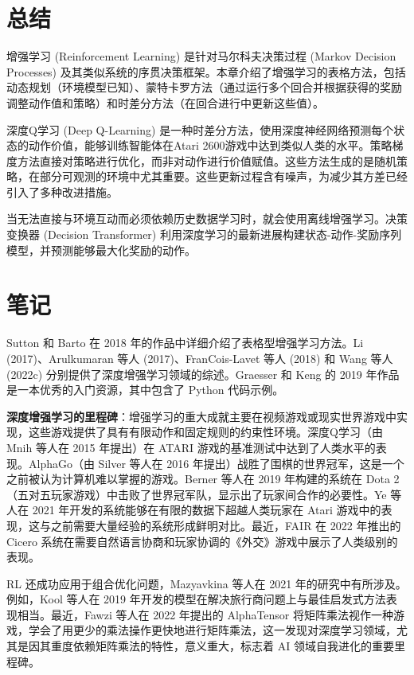 \documentclass[lang=cn,newtx,10pt,scheme=chinese]{elegantbook}
\begin{document}
\section{总结}
增强学习 (Reinforcement Learning) 是针对马尔科夫决策过程 (Markov Decision Processes) 及其类似系统的序贯决策框架。本章介绍了增强学习的表格方法，包括动态规划（环境模型已知）、蒙特卡罗方法（通过运行多个回合并根据获得的奖励调整动作值和策略）和时差分方法（在回合进行中更新这些值）。

深度Q学习 (Deep Q-Learning) 是一种时差分方法，使用深度神经网络预测每个状态的动作价值，能够训练智能体在Atari 2600游戏中达到类似人类的水平。策略梯度方法直接对策略进行优化，而非对动作进行价值赋值。这些方法生成的是随机策略，在部分可观测的环境中尤其重要。这些更新过程含有噪声，为减少其方差已经引入了多种改进措施。

当无法直接与环境互动而必须依赖历史数据学习时，就会使用离线增强学习。决策变换器 (Decision Transformer) 利用深度学习的最新进展构建状态-动作-奖励序列模型，并预测能够最大化奖励的动作。


\section{笔记}
Sutton 和 Barto 在 2018 年的作品中详细介绍了表格型增强学习方法。Li (2017)、Arulkumaran 等人 (2017)、FranCois-Lavet 等人 (2018) 和 Wang 等人 (2022c) 分别提供了深度增强学习领域的综述。Graesser 和 Keng 的 2019 年作品是一本优秀的入门资源，其中包含了 Python 代码示例。

\textbf{深度增强学习的里程碑}：增强学习的重大成就主要在视频游戏或现实世界游戏中实现，这些游戏提供了具有有限动作和固定规则的约束性环境。深度Q学习（由 Mnih 等人在 2015 年提出）在 ATARI 游戏的基准测试中达到了人类水平的表现。AlphaGo（由 Silver 等人在 2016 年提出）战胜了围棋的世界冠军，这是一个之前被认为计算机难以掌握的游戏。Berner 等人在 2019 年构建的系统在 Dota 2（五对五玩家游戏）中击败了世界冠军队，显示出了玩家间合作的必要性。Ye 等人在 2021 年开发的系统能够在有限的数据下超越人类玩家在 Atari 游戏中的表现，这与之前需要大量经验的系统形成鲜明对比。最近，FAIR 在 2022 年推出的 Cicero 系统在需要自然语言协商和玩家协调的《外交》游戏中展示了人类级别的表现。

RL 还成功应用于组合优化问题，Mazyavkina 等人在 2021 年的研究中有所涉及。例如，Kool 等人在 2019 年开发的模型在解决旅行商问题上与最佳启发式方法表现相当。最近，Fawzi 等人在 2022 年提出的 AlphaTensor 将矩阵乘法视作一种游戏，学会了用更少的乘法操作更快地进行矩阵乘法，这一发现对深度学习领域，尤其是因其重度依赖矩阵乘法的特性，意义重大，标志着 AI 领域自我进化的重要里程碑。
\end{document}
